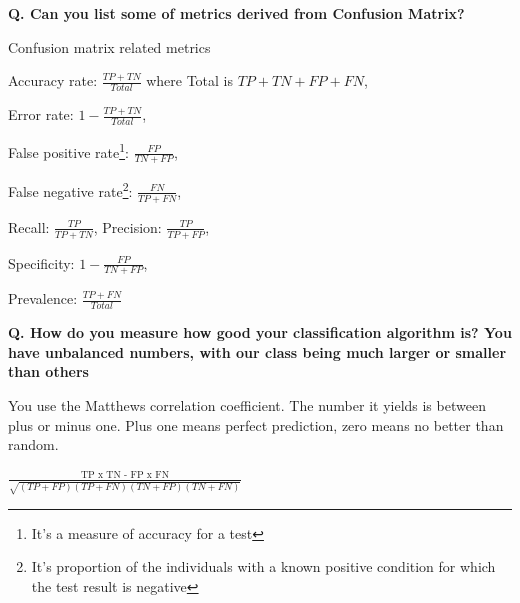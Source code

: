 \begin{frame}[fragile]{\textbf{Q. Can you list some of metrics derived from Confusion Matrix?}}
  \begin{wideitemize}
  \item Confusion matrix related metrics
    \begin{wideitemize}
    \item Accuracy rate: {\footnotesize $\frac{TP + TN}{Total}$}
      where {\footnotesize Total is $TP + TN + FP + FN$},\vspace{-.5em}
    \item Error rate: {\footnotesize $1 - \frac{TP + TN}{Total}$},\vspace{-.5em}
    \item False positive rate\footnote{It's a measure of accuracy for a test}:
    {\footnotesize $\frac{FP}{TN + FP}$},\vspace{-.5em}
    \item False negative rate\footnote{It's proportion of the individuals with a known
    positive condition for which the test result is negative}:
    {\footnotesize $\frac{FN}{TP + FN}$},\vspace{-.5em}
    \item Recall: {\footnotesize $\frac{TP}{TP + TN}$}, Precision: {\footnotesize $\frac{TP}{TP + FP}$},\vspace{-.5em}
    \item Specificity: {\footnotesize $1 - \frac{FP}{TN + FP}$},\vspace{-.5em}
    \item Prevalence: {\footnotesize $\frac{TP + FN}{Total}$}
    \end{wideitemize}
  \end{wideitemize}
\end{frame}

\begin{frame}[fragile]{\textbf{Q. How do you measure how  good your
      classification algorithm is? You have unbalanced numbers, with our class
      being much larger or smaller than others}}
  \begin{wideitemize}
  \item You use the Matthews correlation coefficient. The number it yields is
    between plus or minus one. Plus one means perfect prediction, zero means no
    better than random.
  \item $\frac{\text{TP x TN - FP x FN}}{\sqrt{(TP + FP)(TP + FN)(TN + FP)(TN + FN)}}$
  \end{wideitemize}
\end{frame}


